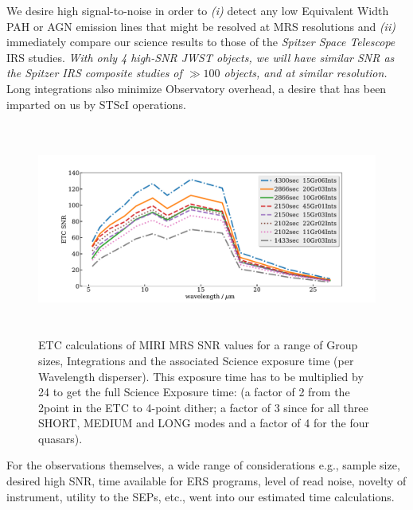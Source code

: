 \smallskip \smallskip
\noindent 
We desire high signal-to-noise in order to {\it(i)} detect any low
Equivalent Width PAH or AGN emission lines that might be resolved at
MRS resolutions and {\it(ii)} immediately compare our science results
to those of the {\it Spitzer Space Telescope} IRS studies.  {\it
With only 4 high-SNR JWST objects, we will have similar SNR as the
Spitzer IRS composite studies of $\gg100$ objects, and at similar
resolution.}  Long integrations also minimize Observatory overhead, a
desire that has been imparted on us by STScI operations.

\begin{figure}[h]
  \begin{center}
    \includegraphics[height=7.0cm,width=16.5cm]{../ETC_calcs/SNR_vs_wavelength_comparisons_full.pdf}
    \end{center}
    \vspace{-20pt}
    \caption{ETC calculations of MIRI MRS SNR values for a range of Group
      sizes, Integrations and the associated Science exposure time (per
      Wavelength disperser).  This exposure time 
      has to be multiplied by 24 to get the full Science Exposure time:   
      (a factor of 2 from the 2point in the ETC to 4-point dither; 
      a factor of 3 since for all three SHORT, MEDIUM and LONG modes and 
      a factor of 4 for the four quasars). 
 }
    \label{fig:SNR_vs_wavelength}
  \end{figure}

\smallskip \smallskip
\noindent 
For the observations themselves, a wide range of considerations e.g.,
sample size, desired high SNR, time available for ERS programs, level
of read noise, novelty of instrument, utility to the SEPs, etc., went
into our estimated time calculations.

